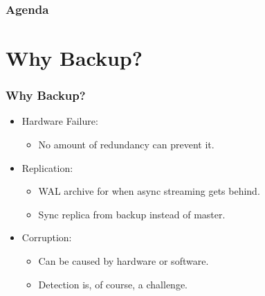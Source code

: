 %
\def\mytitle{Efficiently Backing up Terabytes of Data with pgBackRest}
\def\mysubject{}
\def\myevent{PGCon 2017}
\def\myauthor{David Steele}
\def\myemail{}
\def\mydate{May 25, 2017}

\def\mysuppressnav{}

\def\mytemplatepath{/template/}


\begin{frame}
    \frametitle{Agenda}
    \tableofcontents
\end{frame}

\section{Why Backup?}

\begin{frame}
    \frametitle{Why Backup?}

    \begin{itemize}
        \item Hardware Failure:

        \begin{itemize}
            \item No amount of redundancy can prevent it.\pause
        \end{itemize}

        \item Replication:

        \begin{itemize}
            \item WAL archive for when async streaming gets behind.\pause
            \item Sync replica from backup instead of master.\pause
        \end{itemize}

        \item Corruption:

        \begin{itemize}
            \item Can be caused by hardware or software.\pause
            \item Detection is, of course, a challenge.
        \end{itemize}
    \end{itemize}
\end{frame}

